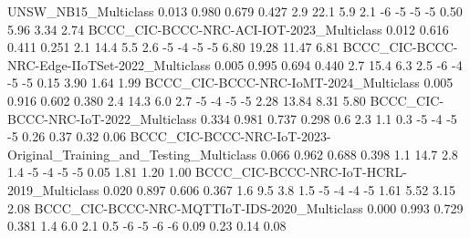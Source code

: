 UNSW_NB15_Multiclass                                                     0.013      0.980       0.679      0.427                   2.9                  22.1                    5.9                   2.1              -6              -5               -5              -5               0.50               5.96                3.34               2.74
BCCC_CIC-BCCC-NRC-ACI-IOT-2023_Multiclass                                0.012      0.616       0.411      0.251                   2.1                  14.4                    5.5                   2.6              -5              -4               -5              -5               6.80              19.28               11.47               6.81
BCCC_CIC-BCCC-NRC-Edge-IIoTSet-2022_Multiclass                           0.005      0.995       0.694      0.440                   2.7                  15.4                    6.3                   2.5              -6              -4               -5              -5               0.15               3.90                1.64               1.99
BCCC_CIC-BCCC-NRC-IoMT-2024_Multiclass                                   0.005      0.916       0.602      0.380                   2.4                  14.3                    6.0                   2.7              -5              -4               -5              -5               2.28              13.84                8.31               5.80
BCCC_CIC-BCCC-NRC-IoT-2022_Multiclass                                    0.334      0.981       0.737      0.298                   0.6                   2.3                    1.1                   0.3              -5              -4               -5              -5               0.26               0.37                0.32               0.06
BCCC_CIC-BCCC-NRC-IoT-2023-Original_Training_and_Testing_Multiclass      0.066      0.962       0.688      0.398                   1.1                  14.7                    2.8                   1.4              -5              -4               -5              -5               0.05               1.81                1.20               1.00
BCCC_CIC-BCCC-NRC-IoT-HCRL-2019_Multiclass                               0.020      0.897       0.606      0.367                   1.6                   9.5                    3.8                   1.5              -5              -4               -4              -5               1.61               5.52                3.15               2.08
BCCC_CIC-BCCC-NRC-MQTTIoT-IDS-2020_Multiclass                            0.000      0.993       0.729      0.381                   1.4                   6.0                    2.1                   0.5              -6              -5               -6              -6               0.09               0.23                0.14               0.08
